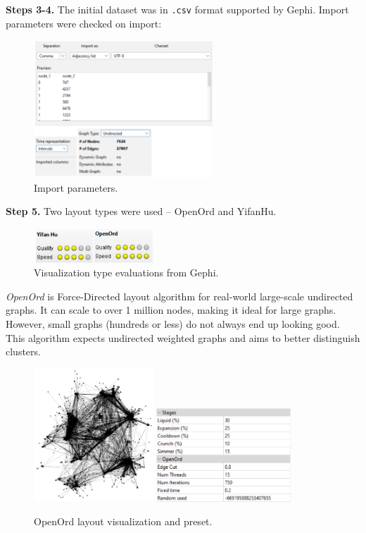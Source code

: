 \documentclass[12pt, a4paper]{article}
\begin{document}
\newpage

\textbf{Steps 3-4.} The initial dataset was in \texttt{.csv} format supported by Gephi. Import parameters were checked on import:
\begin{figure}[!h]
\centering
\includegraphics[width=0.6\textwidth]{s4p1.png}
\caption{Import parameters.}
\end{figure}

\textbf{Step 5.} Two layout types were used -- OpenOrd and YifanHu.

\begin{figure}[!h]
\centering
\includegraphics[width=0.4\textwidth]{s5p1.png}
\caption{Visualization type evaluations from Gephi.}
\end{figure}
\textit{OpenOrd} is Force-Directed layout algorithm for real-world large-scale undirected graphs. It can scale to over 1 million nodes, making it ideal for large graphs. However, small graphs (hundreds or less) do not always end up looking good. This algorithm expects undirected weighted graphs and aims to better distinguish clusters.
\begin{figure}[!h]
\centering
\includegraphics[width=0.4\textwidth]{s5p2.png} \hspace{5mm}
\includegraphics[width=0.45\textwidth]{s5p3.png}
\caption{OpenOrd layout visualization and preset.}
\end{figure}
\end{document}

